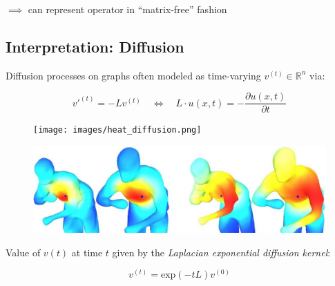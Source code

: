 \documentclass[
  letterpaper,
  DIV=11,
  numbers=noendperiod,
  oneside]{scrartcl}
\begin{document}
\(\implies\) can represent operator in ``matrix-free'' fashion

\subsection{Interpretation: Diffusion}\label{interpretation-diffusion}

Diffusion processes on graphs often modeled as time-varying
\(v^{(t)} \in \mathbb{R}^n\) via:

\[ v'^{(t)} = -L v^{(t)} \quad \Leftrightarrow \quad L \cdot u(x,t) = - \frac{\partial u(x, t)}{\partial t} \]

\begin{figure}

\begin{minipage}[c]{0.31\linewidth}

{\centering 

\texttt{[image: images/heat\_diffusion.png]}

}

\end{minipage}%
%
\begin{minipage}[c]{0.69\linewidth}

{\centering 

\includegraphics[width=5.72917in,height=\textheight]{images/heat_diffusion.jpg}

}

\end{minipage}%

\end{figure}

Value of \(v(t)\) at time \(t\) given by the \emph{Laplacian exponential
diffusion kernel}:

\[v^{(t)} = \mathrm{exp}(-t L) v^{(0)}\]

\end{document}
